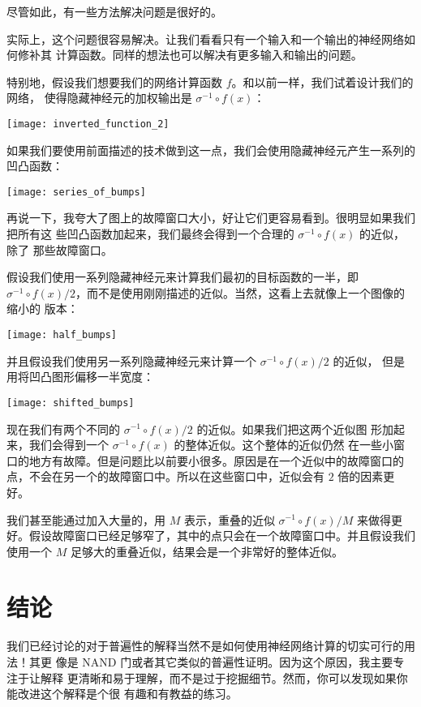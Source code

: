 尽管如此，有一些方法解决问题是很好的。

实际上，这个问题很容易解决。让我们看看只有一个输入和一个输出的神经网络如何修补其
计算函数。同样的想法也可以解决有更多输入和输出的问题。

特别地，假设我们想要我们的网络计算函数 $f$。和以前一样，我们试着设计我们的网络，
使得隐藏神经元的加权输出是 $\sigma^{-1} \circ f(x)$：
\begin{center}
  \texttt{[image: inverted\_function\_2]}
\end{center}

如果我们要使用前面描述的技术做到这一点，我们会使用隐藏神经元产生一系列的凹凸函数：
\begin{center}
  \texttt{[image: series\_of\_bumps]}
\end{center}

再说一下，我夸大了图上的故障窗口大小，好让它们更容易看到。很明显如果我们把所有这
些凹凸函数加起来，我们最终会得到一个合理的 $\sigma^{-1} \circ f(x)$ 的近似，除了
那些故障窗口。

假设我们使用一系列隐藏神经元来计算我们最初的目标函数的一半，即 $\sigma^{-1}
\circ f(x) / 2$，而不是使用刚刚描述的近似。当然，这看上去就像上一个图像的缩小的
版本：
\begin{center}
  \texttt{[image: half\_bumps]}
\end{center}

并且假设我们使用另一系列隐藏神经元来计算一个 $\sigma^{-1} \circ f(x) / 2$ 的近似，
但是用将凹凸图形偏移一半宽度：
\begin{center}
  \texttt{[image: shifted\_bumps]}
\end{center}

现在我们有两个不同的 $\sigma^{-1} \circ f(x) / 2$ 的近似。如果我们把这两个近似图
形加起来，我们会得到一个 $\sigma^{-1} \circ f(x)$ 的整体近似。这个整体的近似仍然
在一些小窗口的地方有故障。但是问题比以前要小很多。原因是在一个近似中的故障窗口的
点，不会在另一个的故障窗口中。所以在这些窗口中，近似会有 $2$ 倍的因素更好。

我们甚至能通过加入大量的，用 $M$ 表示，重叠的近似 $\sigma^{-1} \circ f(x) / M$
来做得更好。假设故障窗口已经足够窄了，其中的点只会在一个故障窗口中。并且假设我们
使用一个 $M$ 足够大的重叠近似，结果会是一个非常好的整体近似。

\section{结论}
\label{sec:conclusion}

我们已经讨论的对于普遍性的解释当然不是如何使用神经网络计算的切实可行的用法！其更
像是 {\serif NAND} 门或者其它类似的普遍性证明。因为这个原因，我主要专注于让解释
更清晰和易于理解，而不是过于挖掘细节。然而，你可以发现如果你能改进这个解释是个很
有趣和有教益的练习。

